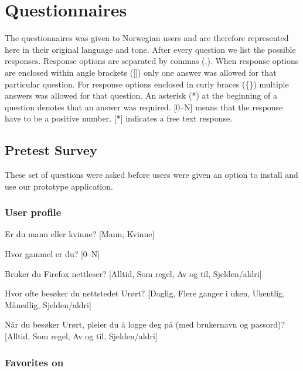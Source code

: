 \chapter{Questionnaires}
\label{appendix:questionnaire}

The questionnaires was given to Norwegian users and are therefore represented
here in their original language and tone. After every question we list the
possible responses. Response options are separated by commas (,). When
response options are enclosed within angle brackets ([]) only one answer was
allowed for that particular question. For response options enclosed in curly
braces (\{\}) multiple answers was allowed for that question. An asterisk (*)
at the beginning of a question denotes that an answer was required. [0--N]
means that the response have to be a positive number. [*] indicates a free
text response.

\enlargethispage{-\baselineskip}

\section{Pretest Survey}

These set of questions were asked before users were given an option to install
and use our prototype application.

\subsection{User profile}

\begin{enum}
  \item Er du mann eller kvinne?
    [Mann, Kvinne]
  \item Hvor gammel er du?
    [0--N]
  \item * Bruker du Firefox nettleser?
    [Alltid, Som regel, Av og til, Sjelden/aldri]
  \item * Hvor ofte besøker du nettstedet Urørt?
    [Daglig, Flere ganger i uken, Ukentlig, Månedlig, Sjelden/aldri]
  \item * Når du besøker Urørt, pleier du å logge deg på (med brukernavn
    og passord)?
    [Alltid, Som regel, Av og til, Sjelden/aldri]
\end{enum}

\subsection{Favorites on \urort{}}

